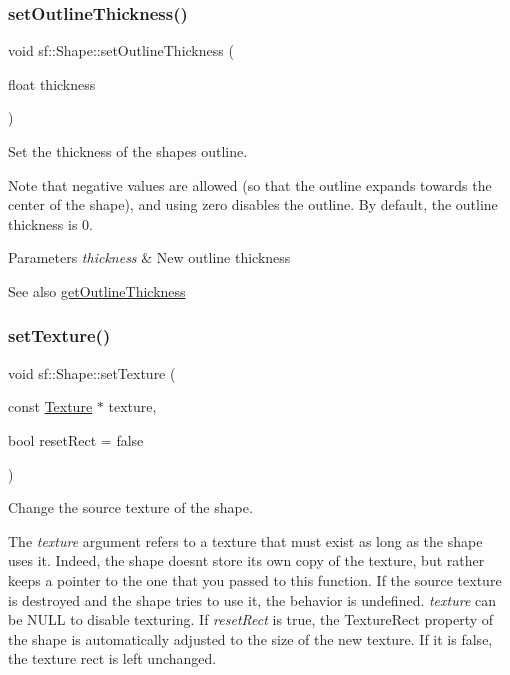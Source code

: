 \subsubsection{\texorpdfstring{set\+Outline\+Thickness()}{setOutlineThickness()}}
{\footnotesize\ttfamily void sf\+::\+Shape\+::set\+Outline\+Thickness (\begin{DoxyParamCaption}\item[{float}]{thickness }\end{DoxyParamCaption})}



Set the thickness of the shape\textquotesingle{}s outline. 

Note that negative values are allowed (so that the outline expands towards the center of the shape), and using zero disables the outline. By default, the outline thickness is 0.


\begin{DoxyParams}{Parameters}
{\em thickness} & New outline thickness\\
\hline
\end{DoxyParams}
\begin{DoxySeeAlso}{See also}
\hyperlink{classsf_1_1_shape_a1d4d5299c573a905e5833fc4dce783a7}{get\+Outline\+Thickness} 
\end{DoxySeeAlso}
\mbox{\label{classsf_1_1_shape_af8fb22bab1956325be5d62282711e3b6}} 
\subsubsection{\texorpdfstring{set\+Texture()}{setTexture()}}
{\footnotesize\ttfamily void sf\+::\+Shape\+::set\+Texture (\begin{DoxyParamCaption}\item[{const \hyperlink{classsf_1_1_texture}{Texture} $\ast$}]{texture,  }\item[{bool}]{reset\+Rect = {\ttfamily false} }\end{DoxyParamCaption})}



Change the source texture of the shape. 

The {\itshape texture} argument refers to a texture that must exist as long as the shape uses it. Indeed, the shape doesn\textquotesingle{}t store its own copy of the texture, but rather keeps a pointer to the one that you passed to this function. If the source texture is destroyed and the shape tries to use it, the behavior is undefined. {\itshape texture} can be N\+U\+LL to disable texturing. If {\itshape reset\+Rect} is true, the Texture\+Rect property of the shape is automatically adjusted to the size of the new texture. If it is false, the texture rect is left unchanged.


